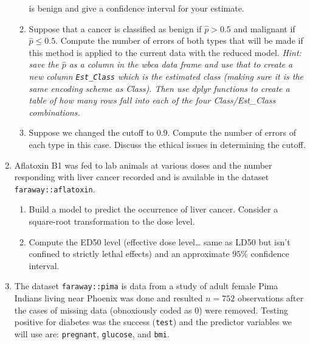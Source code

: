 \documentclass[]{book}
\providecommand{\tightlist}{%
  \setlength{\itemsep}{0pt}\setlength{\parskip}{0pt}}
\theoremstyle{definition}
\theoremstyle{definition}
\theoremstyle{remark}
\begin{document}
\begin{enumerate}
\begin{enumerate}
    is benign and give a confidence interval for your estimate.
  \item
    Suppose that a cancer is classified as benign if \(\hat{p}>0.5\) and
    malignant if \(\hat{p}\le0.5\). Compute the number of errors of both
    types that will be made if this method is applied to the current
    data with the reduced model. \emph{Hint: save the \(\hat{p}\) as a
    column in the wbca data frame and use that to create a new column
    \texttt{Est\_Class} which is the estimated class (making sure it is
    the same encoding scheme as Class). Then use dplyr functions to
    create a table of how many rows fall into each of the four
    Class/Est\_Class combinations.}
  \item
    Suppose we changed the cutoff to \(0.9\). Compute the number of
    errors of each type in this case. Discuss the ethical issues in
    determining the cutoff.
  \end{enumerate}
\item
  Aflatoxin B1 was fed to lab animals at various doses and the number
  responding with liver cancer recorded and is available in the dataset
  \texttt{faraway::aflatoxin}.

  \begin{enumerate}
  \def\labelenumii{\alph{enumii}.}
  \tightlist
  \item
    Build a model to predict the occurrence of liver cancer. Consider a
    square-root transformation to the dose level.
  \item
    Compute the ED50 level (effective dose level\ldots{} same as LD50
    but isn't confined to strictly lethal effects) and an approximate
    \(95\%\) confidence interval.
  \end{enumerate}
\item
  The dataset \texttt{faraway::pima} is data from a study of adult
  female Pima Indians living near Phoenix was done and resulted
  \(n=752\) observations after the cases of missing data (obnoxiously
  coded as 0) were removed. Testing positive for diabetes was the
  success (\texttt{test}) and the predictor variables we will use are:
  \texttt{pregnant}, \texttt{glucose}, and \texttt{bmi}.


\end{enumerate}
\end{document}
